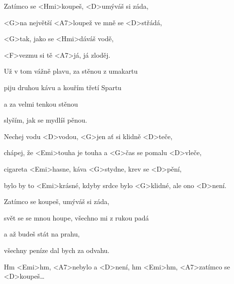 

\zs
Zatímco se <Hmi>koupeš, <D>umýváš si záda,

<G>na největší <A7>loupež ve mně se <D>střádá,

<G\dim>tak, jako se <Hmi>dáváš vodě,

<F\dim>vezmu si tě <A7>já, já zloděj.
\ks

\zs
Už v tom vážně plavu, za stěnou z umakartu

piju druhou kávu a kouřím třetí Spartu

a za velmi tenkou stěnou

slyším, jak se mydlíš pěnou.
\ks

\zr
Nechej vodu <D>vodou, <G>jen ať si klidně <D>teče,

chápej, že <Emi>touha je touha a <G>čas se pomalu <D>vleče,

cigareta <Emi>hasne, káva <G>stydne, krev se <D>pění,

bylo by to <Emi>krásné, kdyby srdce bylo <G>klidné, ale ono <D>není.
\kr

\zs
Zatímco se koupeš, umýváš si záda,

svět se se mnou houpe, všechno mi z rukou padá

a až budeš stát na prahu,

všechny peníze dal bych za odvahu.
\ks

\zr
\kr
Hm <Emi>hm, <A7>nebylo a <D>není, hm <Emi>hm, <A7>zatímco se <D>koupeš…

\kp
